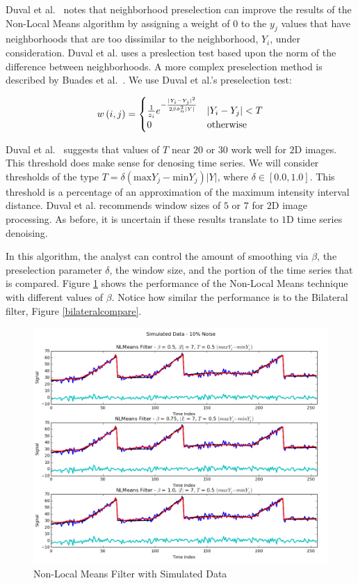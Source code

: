 \documentclass[11pt]{article}
\theoremstyle{definition}
\begin{document}
Duval et al.~\cite{Duval11} notes that neighborhood preselection can improve the results of the Non-Local Means algorithm by assigning a weight of $0$ to the $y_j$ values that have neighborhoods that are too dissimilar to the neighborhood, $Y_i$, under consideration. Duval et al. uses a preslection test based upon the norm of the difference between neighborhoods. A more complex preselection method is described by Buades et al.~\cite{Buades05}. We use Duval et al.'s preselection test:

\begin{displaymath}
w\left(i, j\right) = 
\begin{cases}
\frac{1}{z_i} e^{-\frac{\lvert Y_i - Y_j \rvert ^2}{2 \beta \hat{\sigma}^2_n \lvert Y \rvert}} & \lvert Y_i - Y_j \rvert < T \\
0 & $otherwise$
\end{cases}
\end{displaymath}

Duval et al.~\cite{Duval11} suggests that values of $T$ near $20$ or $30$ work well for $2$D images. This threshold does make sense for denosing time series. We will consider thresholds of the type $T = \delta \left( \mathrm{max} Y_j - \mathrm{min} Y_j \right) \lvert Y \rvert$, where $\delta \in \left[ 0.0, 1.0 \right]$. This threshold is a percentage of an approximation of the maximum intensity interval distance. Duval et al. recommends window sizes of $5$ or $7$ for $2$D image processing. As before, it is uncertain if these results translate to $1$D time series denoising.

In this algorithm, the analyst can control the amount of smoothing via $\beta$, the preselection parameter $\delta$, the window size, and the portion of the time series that is compared. Figure \ref{nlmeanscompare} shows the performance of the Non-Local Means technique with different values of $\beta$. Notice how similar the performance is to the Bilateral filter, Figure \ref{bilateralcompare}.

\begin{figure}
\centering
\includegraphics[width = 0.65 \textwidth]{NLMeansCompare.png}
\caption{Non-Local Means Filter with Simulated Data}
\label{nlmeanscompare}
\end{figure}
\end{document}
